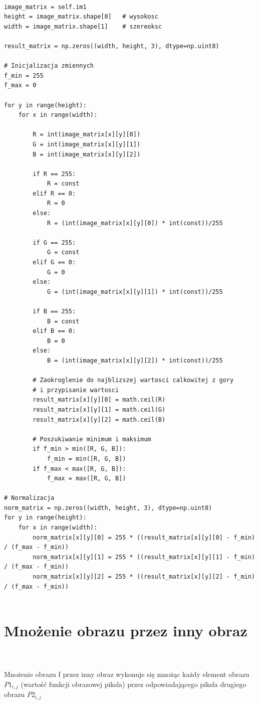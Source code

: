 \documentclass[final,a4paper,openany,12pt]{mwbk}
\begin{document}
\begin{lstlisting}[caption=Mnożenie obrazu barwowego przez zadaną liczbę]

image_matrix = self.im1
height = image_matrix.shape[0]   # wysokosc
width = image_matrix.shape[1]    # szereoksc

result_matrix = np.zeros((width, height, 3), dtype=np.uint8)

# Inicjalizacja zmiennych
f_min = 255
f_max = 0

for y in range(height):
    for x in range(width):  

        R = int(image_matrix[x][y][0])
        G = int(image_matrix[x][y][1])
        B = int(image_matrix[x][y][2])

        if R == 255:
            R = const
        elif R == 0:
            R = 0
        else:
            R = (int(image_matrix[x][y][0]) * int(const))/255 
        
        if G == 255:
            G = const
        elif G == 0:
            G = 0
        else:
            G = (int(image_matrix[x][y][1]) * int(const))/255 
        
        if B == 255:
            B = const
        elif B == 0:
            B = 0
        else:
            B = (int(image_matrix[x][y][2]) * int(const))/255 

        # Zaokroglenie do najblizszej wartosci calkowitej z gory
        # i przypisanie wartosci
        result_matrix[x][y][0] = math.ceil(R)
        result_matrix[x][y][1] = math.ceil(G)
        result_matrix[x][y][2] = math.ceil(B)

        # Poszukiwanie minimum i maksimum                
        if f_min > min([R, G, B]):
            f_min = min([R, G, B])
        if f_max < max([R, G, B]):
            f_max = max([R, G, B])

# Normalizacja
norm_matrix = np.zeros((width, height, 3), dtype=np.uint8)
for y in range(height):
    for x in range(width):
        norm_matrix[x][y][0] = 255 * ((result_matrix[x][y][0] - f_min) / (f_max - f_min))
        norm_matrix[x][y][1] = 255 * ((result_matrix[x][y][1] - f_min) / (f_max - f_min))
        norm_matrix[x][y][2] = 255 * ((result_matrix[x][y][2] - f_min) / (f_max - f_min))


\end{lstlisting}

\section {Mnożenie obrazu przez inny obraz}
\hfill
\\\\
\indent
Mnożenie obrazu f przez inny obraz wykonuje się mnożąc każdy element obrazu $P1_{i,j}$ (wartość funkcji obrazowej piksla) przez odpowiadającego piksla drugiego obrazu $P2_{i,j}$
\end{document}
